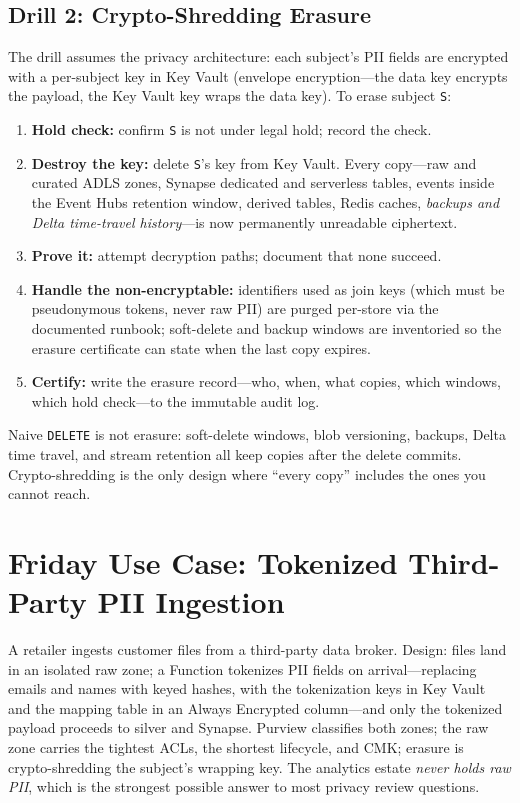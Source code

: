 \subsection{Drill 2: Crypto-Shredding Erasure}
The drill assumes the privacy architecture: each subject's PII fields are encrypted with a per-subject key in Key Vault (envelope encryption---the data key encrypts the payload, the Key Vault key wraps the data key). To erase subject \texttt{S}:

\begin{enumerate}
    \item \textbf{Hold check:} confirm \texttt{S} is not under legal hold; record the check.
    \item \textbf{Destroy the key:} delete \texttt{S}'s key from Key Vault. Every copy---raw and curated ADLS zones, Synapse dedicated and serverless tables, events inside the Event Hubs retention window, derived tables, Redis caches, \emph{backups and Delta time-travel history}---is now permanently unreadable ciphertext.
    \item \textbf{Prove it:} attempt decryption paths; document that none succeed.
    \item \textbf{Handle the non-encryptable:} identifiers used as join keys (which must be pseudonymous tokens, never raw PII) are purged per-store via the documented runbook; soft-delete and backup windows are inventoried so the erasure certificate can state when the last copy expires.
    \item \textbf{Certify:} write the erasure record---who, when, what copies, which windows, which hold check---to the immutable audit log.
\end{enumerate}

\begin{notebox}
Naive \texttt{DELETE} is not erasure: soft-delete windows, blob versioning, backups, Delta time travel, and stream retention all keep copies after the delete commits. Crypto-shredding is the only design where ``every copy'' includes the ones you cannot reach.
\end{notebox}

\section{Friday Use Case: Tokenized Third-Party PII Ingestion}
A retailer ingests customer files from a third-party data broker. Design: files land in an isolated raw zone; a Function tokenizes PII fields on arrival---replacing emails and names with keyed hashes, with the tokenization keys in Key Vault and the mapping table in an Always Encrypted column---and only the tokenized payload proceeds to silver and Synapse. Purview classifies both zones; the raw zone carries the tightest ACLs, the shortest lifecycle, and CMK; erasure is crypto-shredding the subject's wrapping key. The analytics estate \emph{never holds raw PII}, which is the strongest possible answer to most privacy review questions.

